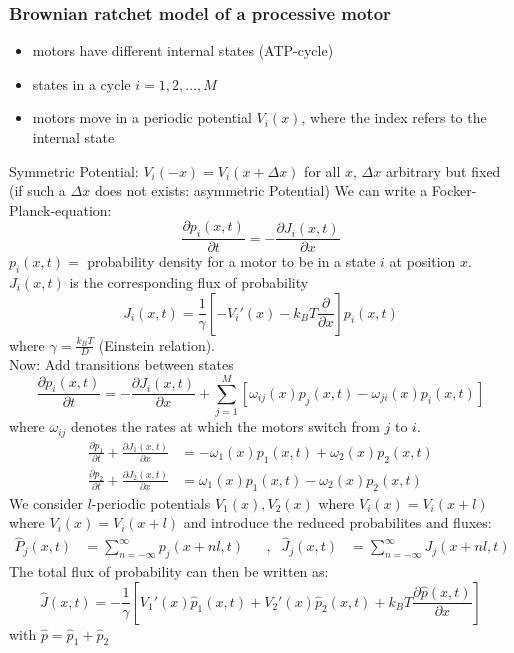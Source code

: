 \subsubsection{Brownian ratchet model of a processive motor}
\begin{itemize}[label={$\to$}]
	\item motors have different internal states (ATP-cycle)
	\item states in a cycle $i=1,2,\ldots ,M$
	\item motors move in a periodic potential $V_i(x)$, where the index refers to the internal state
\end{itemize}
Symmetric Potential: $V_i(-x)=V_i(x+\Delta x)$ for all $x$, $\Delta x$ arbitrary but fixed (if such a $\Delta x$ does not exists: asymmetric Potential)
We can write a Focker-Planck-equation:
\begin{equation*}
	\frac{\partial p_i(x,t)}{\partial t}=-\frac{\partial J_i(x,t)}{\partial x}
\end{equation*}
$p_i(x,t)=$ probability density for a motor to be in a state $i$ at position $x$.\\
$J_i(x,t)$ is the corresponding flux of probability
\begin{equation*}
	J_i(x,t)=\frac{1}{\gamma}\left[-V_i'(x)-k_BT\frac{\partial}{\partial x}\right]p_i(x,t)
\end{equation*}
where $\gamma=\frac{k_BT}{D}$ (Einstein relation).\\
Now: Add transitions between states
\begin{equation*}
	\frac{\partial p_i(x,t)}{\partial t}=-\frac{\partial J_i(x,t)}{\partial x} + \sum\limits_{j=1}^M\left[\omega_{ij}(x)p_j(x,t)-\omega_{ji}(x)p_i(x,t)\right]
\end{equation*}
where $\omega_{ij}$ denotes the rates at which the motors switch from $j$ to $i$.\\
\textbf{\underline{}}
\begin{align*}
	\frac{\partial p_1}{\partial t}+\frac{\partial J_1(x,t)}{\partial x}&=-\omega_1(x)p_1(x,t)+\omega_2(x)p_2(x,t)\\
	\frac{\partial p_2}{\partial t}+\frac{\partial J_2(x,t)}{\partial x}&=\omega_1(x)p_1(x,t)-\omega_2(x)p_2(x,t)
\end{align*}
We consider $l$-periodic potentials $V_1(x),V_2(x)$ where $V_i(x)=V_i(x+l)$ where $V_i(x)=V_i(x+l)$ and introduce the reduced probabilites and fluxes:
\begin{align*}
	\hat{P}_j(x,t)&=\sum\limits_{n=-\infty}^\infty p_j(x+nl,t) & &, & \hat{J}_j(x,t)&=\sum\limits_{n=-\infty}^\infty J_j(x+nl,t)
\end{align*}
The total flux of probability can then be written as:
\begin{equation*}
	\hat{J}(x,t)=-\frac{1}{\gamma}\left[V_1'(x)\hat{p}_1(x,t)+V_2'(x)\hat{p}_2(x,t)+k_BT\frac{\partial\hat{p}(x,t)}{\partial x}\right]
\end{equation*}
with $\hat{p}=\hat{p}_1+\hat{p}_2$\\
